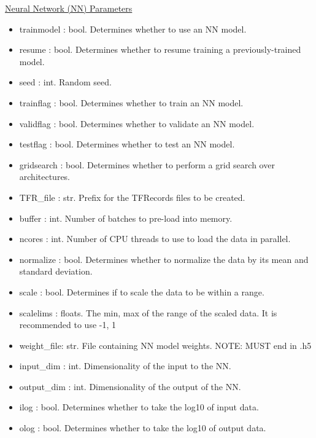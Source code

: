 \documentclass[letterpaper, 12pt]{article}
\begin{document}
\noindent \underline{Neural Network (NN) Parameters}
\begin{itemize}
\item trainmodel : bool. Determines whether to use an NN model.
\item resume     : bool. Determines whether to resume training a 
                         previously-trained model.
\item seed       : int.  Random seed.
\item trainflag  : bool. Determines whether to train    an NN model.
\item validflag  : bool. Determines whether to validate an NN model.
\item testflag   : bool. Determines whether to test     an NN model.
\item gridsearch : bool. Determines whether to perform a grid search over 
                         architectures.

\item TFR\_file   : str.  Prefix for the TFRecords files to be created.
\item buffer     : int.  Number of batches to pre-load into memory.
\item ncores     : int.  Number of CPU threads to use to load the data in 
                         parallel.

\item normalize  : bool. Determines whether to normalize the data by its mean 
                         and standard deviation.
\item scale      : bool. Determines if to scale the data to be within a range.
\item scalelims  : floats. The min, max of the range of the scaled data.
                           It is recommended to use -1, 1

\item weight\_file: str.  File containing NN model weights.
                   NOTE: MUST end in .h5
\item input\_dim  : int.  Dimensionality of the input  to the NN.
\item output\_dim : int.  Dimensionality of the output of the NN.
\item ilog       : bool. Determines whether to take the log10 of input  data.
\item olog       : bool. Determines whether to take the log10 of output data.


\end{itemize}
\end{document}
